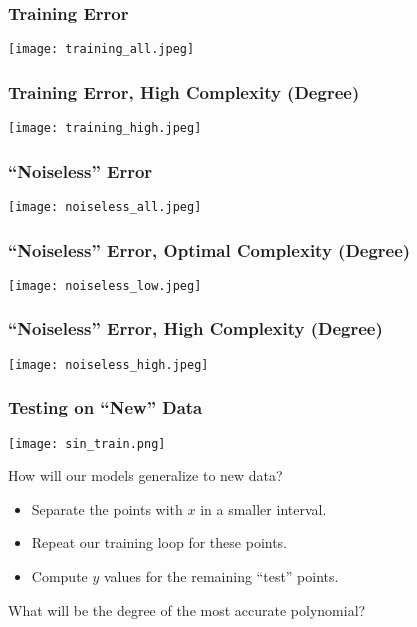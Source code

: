 \documentclass[presentation]{beamer}
\begin{document}
\begin{frame}
\frametitle{Training Error}

\texttt{[image: training\_all.jpeg]}

\end{frame}

\begin{frame}
\frametitle{Training Error, High Complexity (Degree)}

\texttt{[image: training\_high.jpeg]}

\end{frame}

\begin{frame}
\frametitle{``Noiseless'' Error}

\texttt{[image: noiseless\_all.jpeg]}

\end{frame}

\begin{frame}
\frametitle{``Noiseless'' Error, Optimal Complexity (Degree)}

\texttt{[image: noiseless\_low.jpeg]}

\end{frame}

\begin{frame}
\frametitle{``Noiseless'' Error, High Complexity (Degree)}

\texttt{[image: noiseless\_high.jpeg]}

\end{frame}

\begin{frame}
\frametitle{Testing on ``New'' Data}

\texttt{[image: sin\_train.png]}

\vspace{5mm}

How will our models generalize to new data?

\begin{itemize}
\item Separate the points with $x$ in a smaller interval.
\item Repeat our training loop for these points.
\item Compute $y$ values for the remaining ``test'' points.
\end{itemize}

What will be the degree of the most accurate polynomial?

\end{frame}
\end{document}
